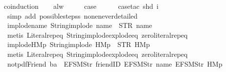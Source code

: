 \begin{isabellebody}
%
\isadelimproof
%
\endisadelimproof
%
\isatagproof
{}\isamarkupfalse%
{\isacharparenleft}coinduction{\isacharparenright}\isanewline
\ \ \isamarkupfalse%
\ alw\isanewline
\ \ \isamarkupfalse%
\ \isamarkupfalse%
\ {\isacharquery}case\isanewline
\ \ \ \ \isamarkupfalse%
\ {\isacharparenleft}case{\isacharunderscore}tac\ {\isachardoublequoteopen}shd\ i{\isachardoublequoteclose}{\isacharparenright}\isanewline
\ \ \ \ \isamarkupfalse%
\ {\isacharparenleft}simp\ add{\isacharcolon}\ possible{\isacharunderscore}steps{\isacharunderscore}s{}\ none{\isacharunderscore}never{\isacharunderscore}detailed{\isacharparenright}\isanewline
{}\isamarkupfalse%
%
\endisatagproof
{\isafoldproof}%
%
\isadelimproof
\isanewline
%
\endisadelimproof
\isanewline
{}\isamarkupfalse%
\ implode{\isacharunderscore}name{\isacharcolon}\ {\isachardoublequoteopen}String{\isachardot}implode\ {\isacharprime}{\isacharprime}name{\isacharprime}{\isacharprime}\ {\isacharequal}\ STR\ {\isacharprime}{\isacharprime}name{\isacharprime}{\isacharprime}{\isachardoublequoteclose}\isanewline
%
\isadelimproof
\ \ %
\endisadelimproof
%
\isatagproof
{}\isamarkupfalse%
\ {\isacharparenleft}metis\ Literal{\isachardot}rep{\isacharunderscore}eq\ String{\isachardot}implode{\isacharunderscore}explode{\isacharunderscore}eq\ zero{\isacharunderscore}literal{\isachardot}rep{\isacharunderscore}eq{\isacharparenright}%
\endisatagproof
{\isafoldproof}%
%
\isadelimproof
\isanewline
%
\endisadelimproof
\isanewline
{}\isamarkupfalse%
\ implode{\isacharunderscore}HM{}p{\isacharcolon}\ {\isachardoublequoteopen}String{\isachardot}implode\ {\isacharprime}{\isacharprime}HM{}p{\isacharprime}{\isacharprime}\ {\isacharequal}\ STR\ {\isacharprime}{\isacharprime}HM{}p{\isacharprime}{\isacharprime}{\isachardoublequoteclose}\isanewline
%
\isadelimproof
\ \ %
\endisadelimproof
%
\isatagproof
{}\isamarkupfalse%
\ {\isacharparenleft}metis\ Literal{\isachardot}rep{\isacharunderscore}eq\ String{\isachardot}implode{\isacharunderscore}explode{\isacharunderscore}eq\ zero{\isacharunderscore}literal{\isachardot}rep{\isacharunderscore}eq{\isacharparenright}%
\endisatagproof
{\isafoldproof}%
%
\isadelimproof
\isanewline
%
\endisadelimproof
\isanewline
{}\isamarkupfalse%
\ not{\isacharunderscore}pdfFriend{\isacharcolon}\ {\isachardoublequoteopen}ba\ {\isasymnoteq}\ {\isacharbrackleft}EFSM{\isachardot}Str\ {\isacharprime}{\isacharprime}friendID{\isacharprime}{\isacharprime}{\isacharcomma}\ EFSM{\isachardot}Str\ {\isacharprime}{\isacharprime}name{\isacharprime}{\isacharprime}{\isacharcomma}\ EFSM{\isachardot}Str\ {\isacharprime}{\isacharprime}HM{}p{\isacharprime}{\isacharprime}{\isacharbrackright}\ {\isasymLongrightarrow}\isanewline

\end{isabellebody}
